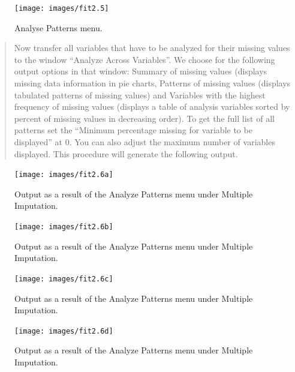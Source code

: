\documentclass[]{book}
\begin{document}
\begin{figure}

{\centering \texttt{[image: images/fit2.5]} 

}

\caption{Analyse Patterns menu.}\label{fig:fig31}
\end{figure}

\begin{quote}
Now transfer all variables that have to be analyzed for their missing
values to the window ``Analyze Across Variables''. We choose for the
following output options in that window: Summary of missing values
(displays missing data information in pie charts, Patterns of missing
values (displays tabulated patterns of missing values) and Variables
with the highest frequency of missing values (displays a table of
analysis variables sorted by percent of missing values in decreasing
order). To get the full list of all patterns set the ``Minimum
percentage missing for variable to be displayed'' at 0. You can also
adjust the maximum number of variables displayed. This procedure will
generate the following output.
\end{quote}

\begin{figure}

{\centering \texttt{[image: images/fit2.6a]} 

}

\caption{Output as a result of the Analyze Patterns menu under Multiple Imputation.}\label{fig:fig32}
\end{figure}\begin{figure}

{\centering \texttt{[image: images/fit2.6b]} 

}

\caption{Output as a result of the Analyze Patterns menu under Multiple Imputation.}\label{fig:fig32}
\end{figure}\begin{figure}

{\centering \texttt{[image: images/fit2.6c]} 

}

\caption{Output as a result of the Analyze Patterns menu under Multiple Imputation.}\label{fig:fig32}
\end{figure}\begin{figure}

{\centering \texttt{[image: images/fit2.6d]} 

}

\caption{Output as a result of the Analyze Patterns menu under Multiple Imputation.}\label{fig:fig32}
\end{figure}
\end{document}
